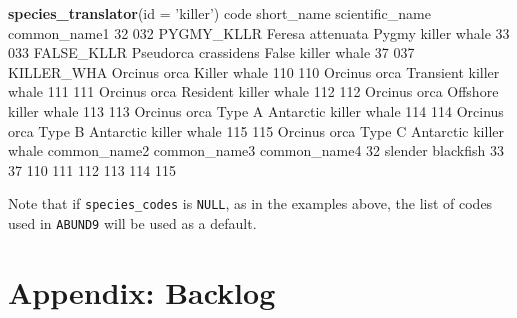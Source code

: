 \documentclass[
]{book}
\newenvironment{Shaded}{\begin{snugshade}}{\end{snugshade}}
\newcommand{\DataTypeTok}[1]{\textcolor[rgb]{0.13,0.29,0.53}{#1}}
\newcommand{\DecValTok}[1]{\textcolor[rgb]{0.00,0.00,0.81}{#1}}
\newcommand{\KeywordTok}[1]{\textcolor[rgb]{0.13,0.29,0.53}{\textbf{#1}}}
\newcommand{\NormalTok}[1]{#1}
\newcommand{\StringTok}[1]{\textcolor[rgb]{0.31,0.60,0.02}{#1}}
\begin{document}
\begin{Shaded}
\begin{Highlighting}[]
\KeywordTok{species_translator}\NormalTok{(}\DataTypeTok{id =} \StringTok{'killer'}\NormalTok{)}
\NormalTok{    code short_name      scientific_name                  common_name1}
\DecValTok{32}   \DecValTok{032}\NormalTok{ PYGMY_KLLR     Feresa attenuata            Pygmy killer whale}
\DecValTok{33}   \DecValTok{033}\NormalTok{ FALSE_KLLR Pseudorca crassidens            False killer whale}
\DecValTok{37}   \DecValTok{037}\NormalTok{ KILLER_WHA         Orcinus orca                  Killer whale}
\DecValTok{110}  \DecValTok{110}\NormalTok{                    Orcinus orca        Transient killer whale}
\DecValTok{111}  \DecValTok{111}\NormalTok{                    Orcinus orca         Resident killer whale}
\DecValTok{112}  \DecValTok{112}\NormalTok{                    Orcinus orca         Offshore killer whale}
\DecValTok{113}  \DecValTok{113}\NormalTok{                    Orcinus orca Type A Antarctic killer whale}
\DecValTok{114}  \DecValTok{114}\NormalTok{                    Orcinus orca Type B Antarctic killer whale}
\DecValTok{115}  \DecValTok{115}\NormalTok{                    Orcinus orca Type C Antarctic killer whale}
\NormalTok{          common_name2 common_name3 common_name4}
\DecValTok{32}\NormalTok{   slender blackfish                          }
\DecValTok{33}                                              
\DecValTok{37}                                              
\DecValTok{110}                                             
\DecValTok{111}                                             
\DecValTok{112}                                             
\DecValTok{113}                                             
\DecValTok{114}                                             
\DecValTok{115}                                             
\end{Highlighting}
\end{Shaded}

Note that if \texttt{species\_codes} is \texttt{NULL}, as in the examples above, the list of codes used in \texttt{ABUND9} will be used as a default.

\hypertarget{backlog}{%
\chapter{Appendix: Backlog}\label{backlog}}
\end{document}
